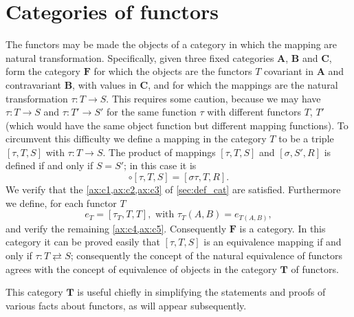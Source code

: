 \documentclass[11pt,a4paper]{report}
\begin{document}
\section{Categories of functors}\label{sec:funct_cat}
The functors may be made the objects of a category in which the mapping are natural transformation.
Specifically, given three fixed categories $\mathbf{A}$, $\mathbf{B}$ and $\mathbf{C}$, form
the category $\mathbf{F}$ for which the objects are the functors $T$ covariant in $\mathbf{A}$ and
contravariant $\mathbf{B}$, with values in $\mathbf{C}$, and for which the mappings are the natural
transformation $\tau:T\rightarrow S$. This requires some caution, because we may have $\tau:T\rightarrow
S$ and $\tau:T'\rightarrow S'$ for the same function $\tau$ with different functors $T$, $T'$ (which
would have the same object function but different mapping functions). To circumvent this difficulty
we define a mapping in the category $T$ to be a triple $[\tau,T,S]$ with $\tau:T\rightarrow S$.
The product of mappings $[\tau,T,S]$ and $[\sigma,S',R]$ is defined if and only if $S=S'$; in this
case it is
\begin{equation*}
	[\sigma,S,R]\circ[\tau,T,S]=[\sigma\tau,T,R].
\end{equation*}
We verify that the \cref{ax:c1,ax:c2,ax:c3} of \cref{sec:def_cat} are satisfied. Furthermore we define, for each
functor $T$
\begin{equation*}
	e_T = [\tau_T,T,T],\text{ with } \tau_T(A,B)=e_{T(A,B)},
\end{equation*}
and verify the remaining \cref{ax:c4,ax:c5}. Consequently $\mathbf{F}$ is a category. In this category it can
be proved easily that $[\tau,T,S]$ is an equivalence mapping if and only if $\tau:T\rightleftarrows S$;
consequently the concept of the natural equivalence of functors agrees with the concept of equivalence
of objects in the category $\mathbf{T}$ of functors.

This category $\mathbf{T}$ is useful chiefly in simplifying the statements and proofs of various facts
about functors, as will appear subsequently.
\end{document}
